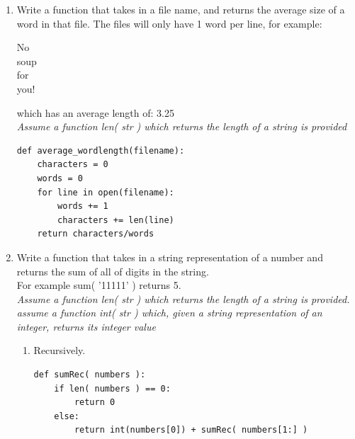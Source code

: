 \documentclass[11pt]{article}
\newenvironment{answer}{\large\lstset{basicstyle=\large}\color{white}}{}
\newenvironment{answer}{\large\lstset{basicstyle=\large}\color{red}}{}
\begin{document}
\begin{enumerate}
\begin{enumerate}
    \end{enumerate}
\pagebreak
    \item Write a function that takes in a file name, and returns the average
        size of a word in that file. The files will only have 1 word per line,
        for example:

        \begin{center}
        No\\
        soup\\
        for\\
        you!
        \end{center}

        which has an average length of: 3.25 \\ \emph{Assume a function len( str ) which returns the length of a string is provided}


\begin{answer}
\begin{lstlisting}
def average_wordlength(filename):
    characters = 0
    words = 0
    for line in open(filename):
        words += 1
        characters += len(line)
    return characters/words
\end{lstlisting}
\end{answer}

    \item Write a function that takes in a string representation of a number and returns the sum
        of all of digits in the string. \\For example sum( '11111' ) returns 5. \\
        \emph{Assume a function len( str ) which returns the length of a string is provided. \\
         assume a function int( str ) which, given a string representation of an integer, returns its integer value }

        \begin{enumerate}
            \item Recursively.
\begin{answer}
\begin{lstlisting}
def sumRec( numbers ):
    if len( numbers ) == 0:
        return 0
    else:
        return int(numbers[0]) + sumRec( numbers[1:] )
\end{lstlisting}
\end{answer}


\end{enumerate}
\end{enumerate}
\end{document}
